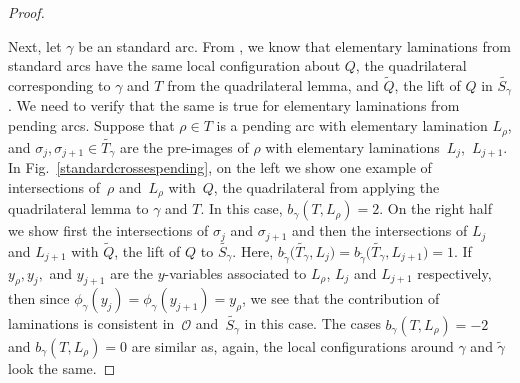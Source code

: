 \begin{proof}
\begin{center}
\end{center}

 Next, let $\gamma$ be an standard arc. From \cite{MSW}, we know that elementary laminations from standard arcs have the same local configuration about $Q$, the quadrilateral corresponding to $\gamma$ and $T$ from the quadrilateral lemma, and $\widetilde{Q}$, the lift of $Q$ in $\widetilde{S_\gamma}$. We need to verify that the same is true for elementary laminations from pending arcs. Suppose that $\rho \in T$ is a pending arc with elementary lamination $L_\rho$, and $\sigma_j, \sigma_{j+1} \in \widetilde{T_\gamma}$ are the pre-images of $\rho$ with elementary laminations~$L_j$,~$L_{j+1}$. In Fig.~\ref{standardcrossespending}, on the left we show one example of intersections of~$\rho$ and~$L_\rho$ with~$Q$, the quadrilateral from applying the quadrilateral lemma to $\gamma$ and $T$. In this case, $b_\gamma(T, L_\rho) = 2$. On the right half we show first the intersections of $\sigma_j$ and $\sigma_{j+1}$ and then the intersections of $L_j$ and $L_{j+1}$ with $\widetilde{Q}$, the lift of $Q$ to $\widetilde{S_\gamma}$. Here, $b_{\widetilde{\gamma}}\big(\widetilde{T_\gamma}, L_j\big) = b_{\widetilde{\gamma}}\big(\widetilde{T_\gamma}, L_{j+1}\big) = 1$. If $y_\rho, y_j,$ and $ y_{j+1}$ are the $y$-variables associated to $L_\rho$, $L_j$ and $L_{j+1}$ respectively, then since $\phi_\gamma(y_j) = \phi_\gamma(y_{j+1}) = y_\rho$, we see that the contribution of laminations is consistent in~$\mathcal{O}$ and~$\widetilde{S_\gamma}$ in this case. The cases $b_\gamma(T, L_\rho) = -2$ and $b_\gamma(T, L_\rho) =0 $ are similar as, again, the local configurations around $\gamma$ and $\widetilde{\gamma}$ look the same.
\end{proof}

